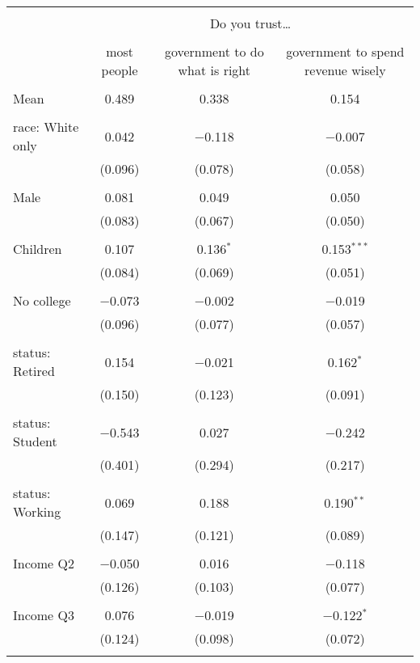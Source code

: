 
\begin{tabular}{@{\extracolsep{5pt}}lccc} 
\\[-1.8ex]\hline 
\hline \\[-1.8ex] 
 & \multicolumn{3}{c}{Do you trust…} \\ 
\cline{2-4} 
\\[-1.8ex] & most people & government to do what is right & government to spend revenue wisely \\ 
\hline \\[-1.8ex] 
 Mean & 0.489 & 0.338 & 0.154  \\ \hline \\[-1.8ex] race: White only & 0.042 & $-$0.118 & $-$0.007 \\ 
  & (0.096) & (0.078) & (0.058) \\ 
  & & & \\ 
 Male & 0.081 & 0.049 & 0.050 \\ 
  & (0.083) & (0.067) & (0.050) \\ 
  & & & \\ 
 Children & 0.107 & 0.136$^{*}$ & 0.153$^{***}$ \\ 
  & (0.084) & (0.069) & (0.051) \\ 
  & & & \\ 
 No college & $-$0.073 & $-$0.002 & $-$0.019 \\ 
  & (0.096) & (0.077) & (0.057) \\ 
  & & & \\ 
 status: Retired & 0.154 & $-$0.021 & 0.162$^{*}$ \\ 
  & (0.150) & (0.123) & (0.091) \\ 
  & & & \\ 
 status: Student & $-$0.543 & 0.027 & $-$0.242 \\ 
  & (0.401) & (0.294) & (0.217) \\ 
  & & & \\ 
 status: Working & 0.069 & 0.188 & 0.190$^{**}$ \\ 
  & (0.147) & (0.121) & (0.089) \\ 
  & & & \\ 
 Income Q2 & $-$0.050 & 0.016 & $-$0.118 \\ 
  & (0.126) & (0.103) & (0.077) \\ 
  & & & \\ 
 Income Q3 & 0.076 & $-$0.019 & $-$0.122$^{*}$ \\ 
  & (0.124) & (0.098) & (0.072) \\ 
  & & & \\ 

\end{tabular}
